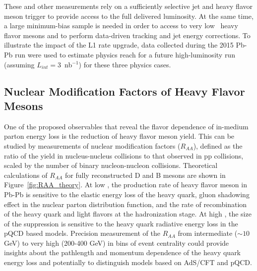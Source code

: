 These and other measurements rely on a sufficiently selective jet and heavy flavor meson trigger to provide access to the full delivered luminosity. At the same time, a large minimum-bias sample is needed in order to access to very low \pt\ heavy flavor mesons and to perform data-driven tracking and jet energy corrections.  To illustrate the impact of the L1 rate upgrade, data collected during the 2015 Pb-Pb run were used to estimate physics reach for a future high-luminosity run (assuming $L_{int} =$3~nb$^{-1}$) for these three physics cases. 


\subsection{Nuclear Modification Factors of Heavy Flavor Mesons}

One of the proposed observables that reveal the flavor dependence of in-medium parton energy loss is the reduction of heavy flavor meson yield. This can be studied by measurements of nuclear modification factors ($R_{AA}$), defined as the ratio of the yield in nucleus-nucleus collisions to that observed in pp collisions, scaled by the number of binary nucleon-nucleon collisions. Theoretical calculations of $R_{AA}$ for fully reconstructed D and B mesons are shown in Figure~\ref{fig:RAA_theory}. At low \pt, the production rate of heavy flavor meson in Pb-Pb is sensitive to the elastic energy loss of the heavy quark, gluon shadowing effect in the nuclear parton distribution function, and the rate of recombination of the heavy quark and light flavors at the hadronization stage. At high \pt, the size of the suppression is sensitive to the heavy quark radiative energy loss in the pQCD based models. Precision measurement of the $R_{AA}$ from intermediate \pt ($\sim 10$ GeV) to very high \pt (200-400 GeV) in bins of event centrality could provide insights about the pathlength and momentum dependence of the heavy quark energy loss and potentially to distinguish models based on AdS/CFT and pQCD. 

